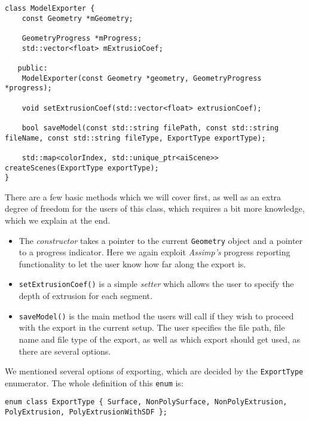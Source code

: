 \begin{lstlisting}
class ModelExporter {
    const Geometry *mGeometry;

    GeometryProgress *mProgress;
    std::vector<float> mExtrusioCoef;

   public:
    ModelExporter(const Geometry *geometry, GeometryProgress *progress);

    void setExtrusionCoef(std::vector<float> extrusionCoef);

    bool saveModel(const std::string filePath, const std::string fileName, const std::string fileType, ExportType exportType);

    std::map<colorIndex, std::unique_ptr<aiScene>> createScenes(ExportType exportType);
}

\end{lstlisting}

There are a few basic methods which we will cover first, as well as an extra degree of freedom for the users of this class, which requires a bit more knowledge, which we explain at the end.

\begin{itemize}

\item The \textit{constructor} takes a pointer to the current \texttt{Geometry} object and a pointer to a progress indicator. Here we again exploit \textit{Assimp's} progress reporting functionality to let the user know how far along the export is.

\item \texttt{setExtrusionCoef()} is a simple \textit{setter} which allows the user to specify the depth of extrusion for each segment.

\item \texttt{saveModel()} is the main method the users will call if they wish to proceed with the export in the current setup. The user specifies the file path, file name and file type of the export, as well as which export should get used, as there are several options.
\end{itemize}

We mentioned several options of exporting, which are decided by the \texttt{Export\-Type} enumerator. The whole definition of this \texttt{enum} is:

\begin{lstlisting}
enum class ExportType { Surface, NonPolySurface, NonPolyExtrusion, PolyExtrusion, PolyExtrusionWithSDF };
\end{lstlisting}

